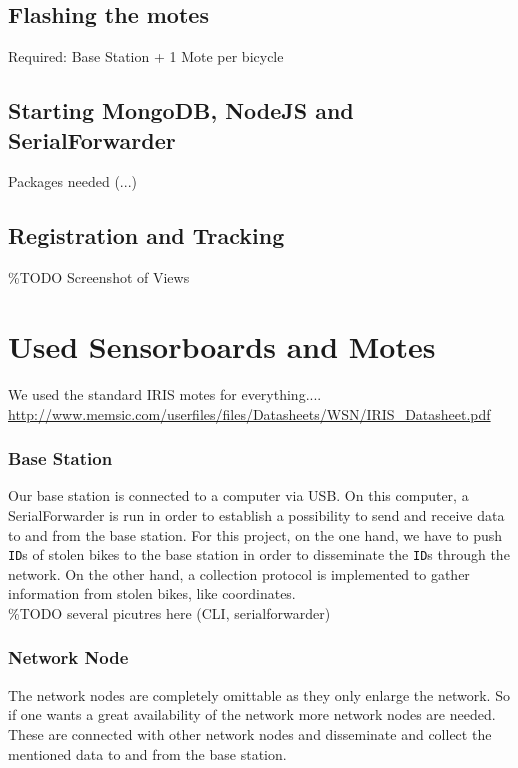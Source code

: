 \documentclass[a4paper]{article}
\begin{document}
\subsection{Flashing the motes}
Required: Base Station + 1 Mote per bicycle
\subsection{Starting MongoDB, NodeJS and SerialForwarder}
Packages needed (...)
\subsection{Registration and Tracking}
\%TODO Screenshot of Views

\section{Used Sensorboards and Motes}
We used the standard IRIS motes for everything....
\url{http://www.memsic.com/userfiles/files/Datasheets/WSN/IRIS_Datasheet.pdf}
\subsubsection{Base Station}
Our base station is connected to a computer via USB. On this computer, a SerialForwarder is run in order to establish a possibility to send and receive data to and from the base station. For this project, on the one hand, we have to push \texttt{ID}s of stolen bikes to the base station in order to disseminate the \texttt{ID}s through the network. On the other hand, a collection protocol is implemented to gather information from stolen bikes, like coordinates.\\
\%TODO several picutres here (CLI, serialforwarder)
\subsubsection{Network Node}
The network nodes are completely omittable as they only enlarge the network. So if one wants a great availability of the network more network nodes are needed. These are connected with other network nodes and disseminate and collect the mentioned data to and from the base station.
\end{document}
